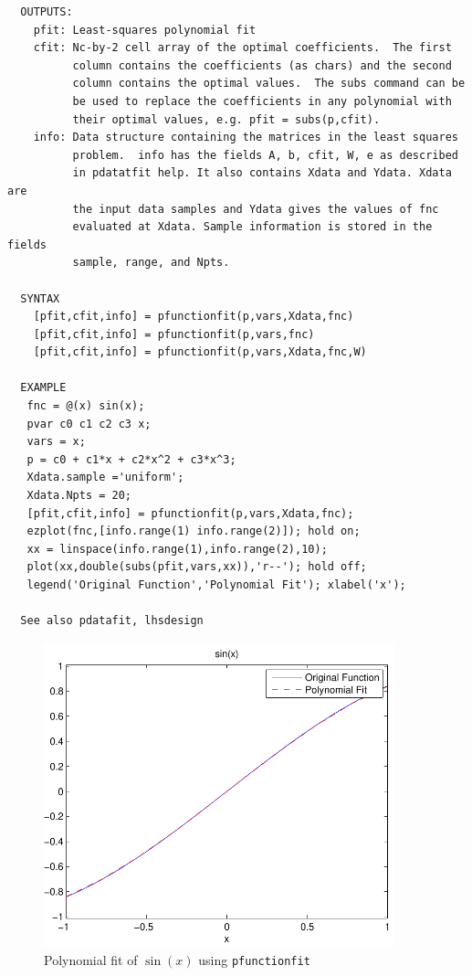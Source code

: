 \documentclass{article}
\begin{document}
\begin{verbatim}
  OUTPUTS:
    pfit: Least-squares polynomial fit
    cfit: Nc-by-2 cell array of the optimal coefficients.  The first
          column contains the coefficients (as chars) and the second
          column contains the optimal values.  The subs command can be
          be used to replace the coefficients in any polynomial with
          their optimal values, e.g. pfit = subs(p,cfit).
    info: Data structure containing the matrices in the least squares
          problem.  info has the fields A, b, cfit, W, e as described
          in pdatatfit help. It also contains Xdata and Ydata. Xdata are
          the input data samples and Ydata gives the values of fnc
          evaluated at Xdata. Sample information is stored in the fields
          sample, range, and Npts.

  SYNTAX
    [pfit,cfit,info] = pfunctionfit(p,vars,Xdata,fnc)
    [pfit,cfit,info] = pfunctionfit(p,vars,fnc)
    [pfit,cfit,info] = pfunctionfit(p,vars,Xdata,fnc,W)

  EXAMPLE
   fnc = @(x) sin(x);
   pvar c0 c1 c2 c3 x;
   vars = x;
   p = c0 + c1*x + c2*x^2 + c3*x^3;
   Xdata.sample ='uniform';
   Xdata.Npts = 20;
   [pfit,cfit,info] = pfunctionfit(p,vars,Xdata,fnc);
   ezplot(fnc,[info.range(1) info.range(2)]); hold on;
   xx = linspace(info.range(1),info.range(2),10);
   plot(xx,double(subs(pfit,vars,xx)),'r--'); hold off;
   legend('Original Function','Polynomial Fit'); xlabel('x');

  See also pdatafit, lhsdesign

\end{verbatim}

\begin{figure}[h]
\begin{center}
\includegraphics[width=4in]{figs/pfunctionfitPLOT.pdf}
\caption{Polynomial fit of $\sin(x)$ using \texttt{pfunctionfit}}
\end{center}
\end{figure}
\end{document}
